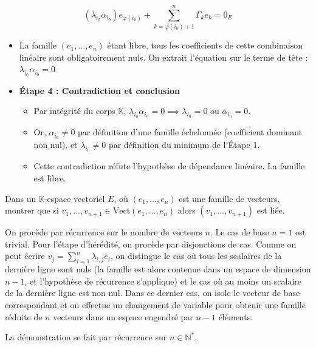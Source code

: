 \documentclass[11pt, a4paper]{article}
\theoremstyle{definition}
\begin{document}
\[
\left(\lambda_{i_0} \alpha_{i_0}\right) e_{\varphi(i_0)} + \sum_{k=\varphi(i_0)+1}^n \Gamma_k e_k = 0_E
\]
\begin{itemize}
\item La famille $(e_1, \dots, e_n)$ étant libre, tous les coefficients de cette combinaison linéaire sont obligatoirement nuls. On extrait l'équation sur le terme de tête : \(
\lambda_{i_0} \alpha_{i_0} = 0
\)
\item \textbf{Étape 4 : Contradiction et conclusion}
\begin{itemize}
\item Par intégrité du corps $\mathbb{K}$, $\lambda_{i_0} \alpha_{i_0} = 0 \implies \lambda_{i_0} = 0$ ou $\alpha_{i_0} = 0$.
\item Or, $\alpha_{i_0} \neq 0$ par définition d'une famille échelonnée (coefficient dominant non nul), et $\lambda_{i_0} \neq 0$ par définition du minimum de l'Étape 1.
\item Cette contradiction réfute l'hypothèse de dépendance linéaire. La famille est libre.
\end{itemize}
\end{itemize}

\clearpage

\begin{tcolorbox}[instructionstyle]
Dans un $\mathbb K$-espace vectoriel $E$, où $(e_1,\dots,e_n)$ est une famille de vecteurs, montrer que si $v_1,\dots,v_{n+1} \in \mathrm{Vect}(e_1,\dots,e_n)$ alors $(v_1,\dots,v_{n+1})$ est liée.
\end{tcolorbox}

\begin{tcolorbox}[methodstyle]
	On procède par récurrence sur le nombre de vecteurs $n$. Le cas de base $n=1$ est trivial. Pour l'étape d'hérédité, on procède par disjonctions de cas. Comme on peut écrire $v_j = \sum_{i=1}^n \lambda_{i,j} e_i$, on distingue le cas où tous les scalaires de la dernière ligne sont nuls (la famille est alors contenue dans un espace de dimension $n-1$, et l'hypothèse de récurrence s'applique) et le cas où au moins un scalaire de la dernière ligne est non nul. Dans ce dernier cas, on isole le vecteur de base correspondant et on effectue un changement de variable pour obtenir une famille réduite de $n$ vecteurs dans un espace engendré par $n-1$ éléments.
\end{tcolorbox}

La démonstration se fait par récurrence sur $n \in \mathbb{N}^*$.
\end{document}

